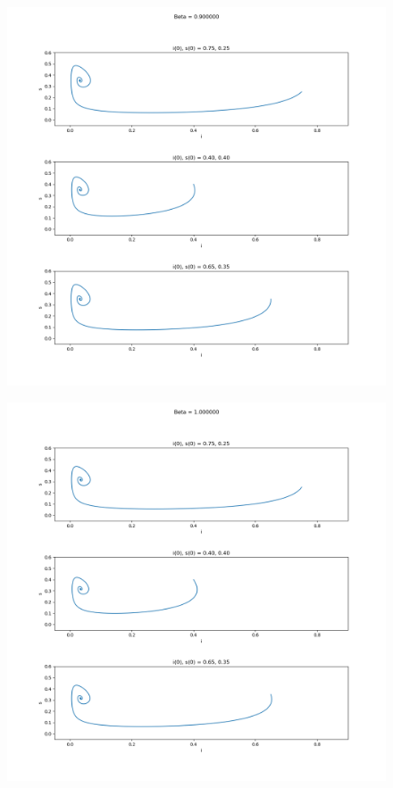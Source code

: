 \documentclass[11pt,a4paper]{CLabBookTemplate} %
\begin{document}
\begin{figure}[h!]
	\centering
	\includegraphics[width = 160mm]{Figures/Task1_0.png}
	\caption{}
	\label{fig:Task1_0}
\end{figure}
\begin{figure}[h!]
	\centering
	\includegraphics[width = 160mm]{Figures/Task1_1.png}
	\caption{}
	\label{fig:Task1_1}
\end{figure}
\end{document}
